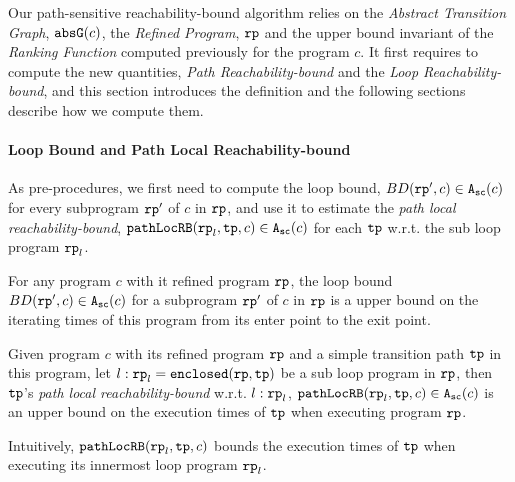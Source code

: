 Our path-sensitive reachability-bound algorithm relies on the \emph{Abstract Transition Graph}, $\mathtt{abs}{\mathtt{G}}(c)$, the \emph{Refined Program}, $\mathtt{rp}$ and the upper bound invariant of the \emph{Ranking Function} computed previously for the program $c$.
It first requires to compute the new quantities, \emph{Path Reachability-bound} and the \emph{Loop Reachability-bound}, and this section introduces the definition and the following sections describe how we compute them.


\paragraph{Loop Bound and Path Local Reachability-bound}
As pre-procedures, we first need to compute the loop bound, $BD(\mathtt{rp}', c) \in {\ensuremath{\mathtt{A_{sc}}}}(c)$ for every subprogram $\mathtt{rp}'$ of $c$ in $\mathtt{rp}$, and use it to estimate the \emph{path local reachability-bound}, $\mathtt{pathLocRB}(\mathtt{rp}_l, \mathtt{tp}, c) \in {\ensuremath{\mathtt{A_{sc}}}}(c)$ for each $\mathtt{tp}$ w.r.t. the sub loop program $\mathtt{rp}_l$.
\begin{defn}
  For any program $c$ with it refined program $\mathtt{rp}$,
  the loop bound $BD(\mathtt{rp}', c) \in {\ensuremath{\mathtt{A_{sc}}}}(c)$ for a subprogram $\mathtt{rp}'$ of $c$ in $\mathtt{rp}$ is a upper bound on the iterating times of this program from its enter point to the exit point.
\end{defn}
% 
\begin{defn}
  Given program $c$ with its refined program $\mathtt{rp}$ and a simple transition path $\mathtt{tp}$ in this program, 
  let $l: \mathtt{rp}_l = \mathtt{enclosed}(\mathtt{rp}, \mathtt{tp})$ be a sub loop program in $\mathtt{rp}$,
  then $\mathtt{tp}$'s \emph{path local reachability-bound} w.r.t. $l: \mathtt{rp}_l$,  $\mathtt{pathLocRB}(\mathtt{rp}_l, \mathtt{tp}, c) \in {\ensuremath{\mathtt{A_{sc}}}}(c)$
  is an upper bound on the execution times of $\mathtt{tp}$ when executing program $\mathtt{rp}$.
\end{defn}
Intuitively,
$\mathtt{pathLocRB}(\mathtt{rp}_l, \mathtt{tp}, c)$ bounds the execution times of $\mathtt{tp}$ when executing its innermost loop program $\mathtt{rp}_l$.
